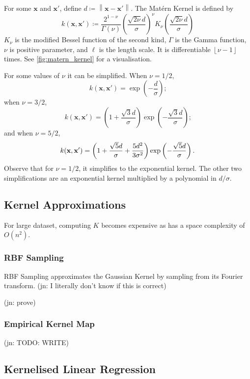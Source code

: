 \documentclass[11pt,twoside]{report}
\newcommand\bx{\mathbf{x}}
\newcommand\norm[1]{\left\|#1\right\|}
\newcommand\floor[1]{\left\lfloor#1\right\rfloor}
\newcommand\jn[1]{{\color{red}(jn: #1)}}
\begin{document}
For some $\bx$ and $\bx'$, define $d \coloneqq \norm{\bx - \bx'}$. The Mat\'ern Kernel is defined by \[
    k(\bx, \bx') \coloneqq \frac{2^{1-\nu}}{\Gamma(\nu)}\left(\frac{\sqrt{2\nu}d}{\sigma}\right)^\nu K_\nu\left(\frac{\sqrt{2\nu}d}{\sigma}\right)
\]$K_\nu$ is the modified Bessel function of the second kind, $\Gamma$ is the Gamma function, $\nu$ is positive parameter, and $\ell$ is the length scale. It is differentiable $\floor{\nu-1}$ times. See \cref{fig:matern_kernel} for a visualisation.

For some values of $\nu$ it can be simplified. When $\nu = 1/2$,
 \[
   k(\bx, \bx') = \exp\left(-\frac{d}{\sigma}\right) \text{;}
 \] when $\nu=3/2$, \[
   k(\bx, \bx') = \left(1 + \frac{\sqrt{3}d}{\sigma}\right)\exp\left(-\frac{\sqrt{3}d}{\sigma}\right) \text{;}
 \] and when $\nu = 5/2$,\[
  k(\bx, \bx') = \left(1 + \frac{\sqrt{5}d}{\sigma} + \frac{5d^2}{3\sigma^2}\right)\exp\left(-\frac{\sqrt{5}d}{\sigma}\right) \text.
 \] Observe that for $\nu=1/2$, it simplifies to the exponential kernel. The other two simplifications are an exponential kernel multiplied by a polynomial in $d/\sigma$.
\subsection{Kernel Approximations}

For large dataset, computing $K$ becomes expensive as has a space complexity of $O(n^2)$.

\subsubsection{RBF Sampling}

RBF Sampling approximates the Gaussian Kernel by sampling from its Fourier transform. \jn{I literally don't know if this is correct}

\jn{prove}

\subsubsection{Empirical Kernel Map}

\jn{TODO: WRITE}


\subsection{Kernelised Linear Regression}
\end{document}

